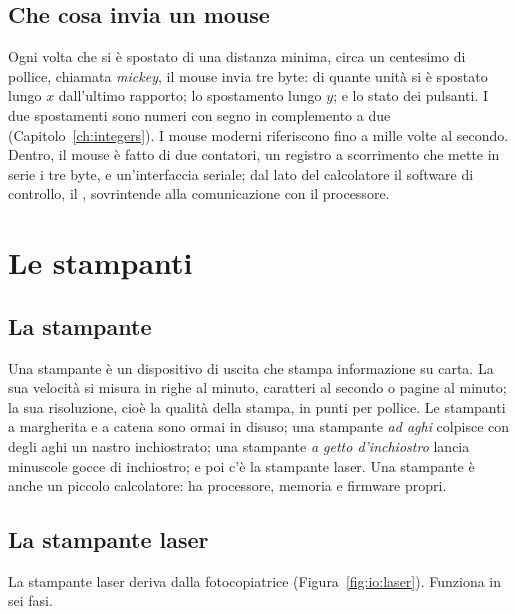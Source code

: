 \subsection{Che cosa invia un mouse}

Ogni volta che si è spostato di una distanza minima, circa un centesimo di
pollice, chiamata \emph{mickey}, il mouse invia tre byte: di quante unità si è
spostato lungo $x$ dall'ultimo rapporto; lo spostamento lungo $y$; e lo stato
dei pulsanti. I due spostamenti sono numeri con segno in complemento a due
(Capitolo~\ref{ch:integers}). I mouse moderni riferiscono fino a mille volte
al secondo. Dentro, il mouse è fatto di due contatori, un registro a
scorrimento che mette in serie i tre byte, e un'interfaccia seriale; dal lato
del calcolatore il software di controllo, il ,
sovrintende alla comunicazione con il processore.

\section{Le stampanti}

\subsection{La stampante}

Una stampante è un dispositivo di uscita che stampa informazione su carta. La
sua velocità si misura in righe al minuto, caratteri al secondo o pagine al
minuto; la sua risoluzione, cioè la qualità della stampa, in punti per
pollice. Le stampanti a margherita e a catena sono ormai in disuso; una
stampante \emph{ad aghi} colpisce con degli aghi un nastro inchiostrato; una
stampante \emph{a getto d'inchiostro} lancia minuscole gocce di inchiostro; e
poi c'è la stampante laser. Una stampante è anche un piccolo calcolatore: ha
processore, memoria e firmware propri.

\subsection{La stampante laser}

La stampante laser deriva dalla fotocopiatrice
(Figura~\ref{fig:io:laser}). Funziona in sei fasi.

